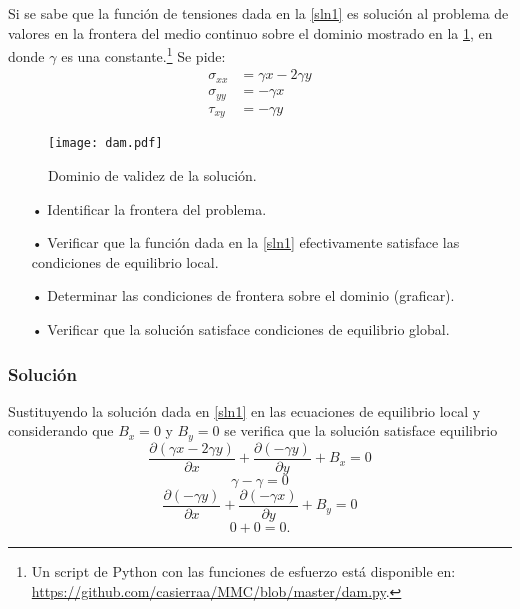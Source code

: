 \documentclass[../notas medios.tex]{subfiles}
\begin{document}
Si se sabe que la función de tensiones dada en la \cref{sln1} es solución al problema de valores en la frontera del medio continuo sobre el dominio mostrado en la \cref{dam}, en donde $\gamma$ es una constante.\footnote{Un script de Python con las funciones de esfuerzo está disponible en: \url{https://github.com/casierraa/MMC/blob/master/dam.py}.} Se pide:
\begin{equation}
\begin{split}
\sigma_{xx} & = \gamma x - 2\gamma y \\
\sigma_{yy} & =  - \gamma x \\
\tau_{xy}   & =  - \gamma y
\end{split}
\label{sln1}
\end{equation}

\begin{figure}[H]
\centering
	\texttt{[image: dam.pdf]}
	\caption{Dominio de validez de la solución.}
	\label{dam}
\end{figure}


\begin{itemize}
\item[•] Identificar la frontera del problema.
\item[•] Verificar que la función dada en la \cref{sln1} efectivamente satisface las condiciones de equilibrio local.
\item[•] Determinar las condiciones de frontera sobre el dominio (graficar).
\item[•] Verificar que la solución satisface condiciones de equilibrio global.
\end{itemize}


\subsubsection*{Solución}
Sustituyendo la solución dada en \cref{sln1} en las ecuaciones de equilibrio local y considerando que $B_x =0$ y $B_y =0$ se verifica que la solución satisface equilibrio
\[\frac{{\partial (\gamma x - 2\gamma y)}}{{\partial x}} + \frac{{\partial ( - \gamma y)}}{{\partial y}} + {B_x} = 0\]
\[\gamma  - \gamma  = 0\] 
\[\frac{{\partial ( - \gamma y)}}{{\partial x}} + \frac{{\partial ( - \gamma x)}}{{\partial y}} + {B_y} = 0\]
\[0 + 0 = 0.\]
\end{document}

